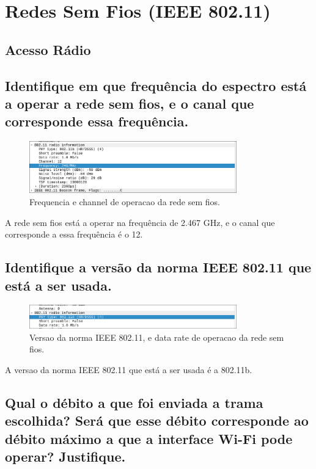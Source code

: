 \section{Redes Sem Fios (IEEE 802.11)}
\subsection*{Acesso Rádio}
\subsection{Identifique em que frequência do espectro está a operar a rede sem fios, e o canal que corresponde essa frequência.}

\begin{figure}[h]
    \centering
    \includegraphics[width=0.8\textwidth]{freq.png}
    \caption{\label{fig:freq}Frequencia e channel de operacao da rede sem fios.}
\end{figure}

A rede sem fios está a operar na frequência de 2.467 GHz, e o canal que corresponde a essa frequência é o 12.

\subsection{Identifique a versão da norma IEEE 802.11 que está a ser usada.}

\begin{figure}[h]
    \centering
    \includegraphics[width=0.8\textwidth]{ver.png}
    \caption{\label{fig:ver}Versao da norma IEEE 802.11, e data rate de operacao da rede sem fios.}
\end{figure}

A versao da norma IEEE 802.11 que está a ser usada é a 802.11b.

\subsection{Qual o débito a que foi enviada a trama escolhida? Será que esse débito  corresponde ao débito máximo a que a interface Wi-Fi pode operar? Justifique.}

